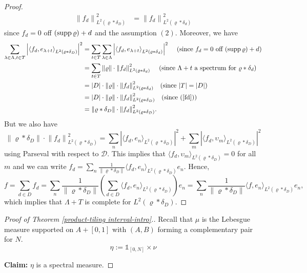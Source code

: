 \documentclass[reqno,a4paper,12pt]{amsart}
\numberwithin{equation}{section}
\newcommand{\Abs}[1]{{\left|{#1}\right|}}
\newcommand{\Norm}[1]{{\left\|{#1}\right\|}}
\newcommand{\inner}[2]{{\langle #1, #2 \rangle}}
\newcounter{rem}
\theoremstyle{remark}
\numberwithin{equation}{section}
\DeclareMathOperator\supp{\rm supp}
\begin{document}
{\begin{proof}
\begin{align}\label{fd}
\Norm{f_d}^2_{L^2(\varrho*{\delta}_D)}
&=\Norm{f_d}^2_{L^2(\varrho*\delta_d)}
\end{align}
{since $f_d=0$ off $(\supp\varrho)+d$ and the assumption $(2)$}. Moreover, we have
\begin{align*}
\sum_{\lambda \in \Lambda, t \in T} \Abs{\inner{f_d}{e_{\lambda+t}}_{L^2(\varrho*{\delta}_D)}}^2
 &= \sum_{t \in T} \sum_{\lambda \in \Lambda} \Abs{\inner{f_d}{e_{\lambda+t}}_{L^2(\varrho*\delta_d)}}^2\ \ \ \text{ (since $f_d=0$ off $(\supp\varrho)+d$)}\\
 &= \sum_{t \in T} \Norm{\varrho} \cdot \Norm{f_d}^2_{L^2(\varrho*\delta_d)}\ \ \ \text{ (since $\Lambda+t$ a spectrum for $\varrho*\delta_d$)}\\
 &= \Abs{D} \cdot \Norm{\varrho} \cdot \Norm{f_d}^2_{L^2(\varrho*\delta_d)}\ \ \ \text{(since $\Abs{T}=\Abs{D}$)}\\
 &= \Abs{D} \cdot \Norm{\varrho} \cdot \Norm{f_d}^2_{L^2(\varrho*{\delta}_D)}\ \ \ (\text{since (\ref{fd})})\\
 &= \Norm{\varrho*{\delta}_D} \cdot \Norm{f_d}^2_{L^2(\varrho*{\delta}_D)}.
\end{align*}
But we also have 
\[\Norm{\varrho*{\delta}_D}\cdot \Norm{f_d}^2_{L^2(\varrho*{\delta}_D)}=\sum_{n} \Abs{\inner{f_d}{e_{n}}_{L^2(\varrho*{\delta}_D)}}^2+\sum_{m} \Abs{\inner{f_d}{\upsilon_{m}}_{L^2(\varrho*{\delta}_D)}}^2\]
using Parseval with respect to $\mathcal{D}$. This implies that $\inner{f_d}{\upsilon_{m}}_{L^2(\varrho*{\delta}_D)}=0$ for all $m$ and we can write $f_d=\sum_{n}{\frac{1}{\Norm{\varrho*{\delta}_D}}}\inner{f_d}{e_{n}}_{L^2(\varrho*{\delta}_D)}e_n$. Hence, 
\[f=\sum_{d\in D} f_d=\sum_{n}{\frac{1}{\Norm{\varrho*{\delta}_D}}}\left(\sum_{d\in D}\inner{f_d}{e_{n}}_{L^2(\varrho*{\delta}_D)}\right)e_n=\sum_{n}{\frac{1}{\Norm{\varrho*{\delta}_D}}}\inner{f}{e_{n}}_{L^2(\varrho*{\delta}_D)}e_n,\]
which implies that $\Lambda+T$ is complete for $L^2(\varrho*{\delta}_D)$.
\end{proof}


\begin{proof}[Proof of Theorem \ref{product-tiling interval-intro}.] Recall that $\mu$ is the Lebesgue measure supported on $A+[0,1]$ with $(A,B)$ forming a complementary pair for $N$. 
 $$\eta := \mathds{1}_{[0, N]}\times \nu $$

\medskip

{\bf Claim:} $\eta$ is a spectral measure. 

\medskip


\end{proof}}
\end{document}
